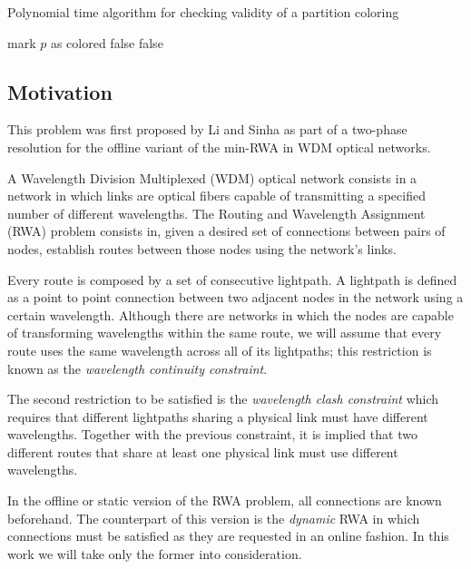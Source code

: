 \begin{algorithm}
\caption{Polynomial time algorithm for checking validity of a partition coloring}
\label{alg:pcpvalidity}
\begin{algorithmic}

			\STATE mark $p$ as colored
					\RETURN false
				\ENDIF	
			\ENDFOR
		\ENDIF
	\ENDFOR
		\RETURN false
	\ENDIF	
\ENDFOR

\end{algorithmic}
\end{algorithm}

\subsection{Motivation}

This problem was first proposed by Li and Sinha \cite{Li00thepartition} as part of a two-phase resolution for the offline variant of the min-RWA in WDM optical networks.

A Wavelength Division Multiplexed (WDM) optical network consists in a network in which links are optical fibers capable of transmitting a specified number of different wavelengths. The Routing and Wavelength Assignment (RWA) problem consists in, given a desired set of connections between pairs of nodes, establish routes between those nodes using the network's links.

Every route is composed by a set of consecutive lightpath. A lightpath is defined as a point to point connection between two adjacent nodes in the network using a certain wavelength. Although there are networks in which the nodes are capable of transforming wavelengths within the same route, we will assume that every route uses the same wavelength across all of its lightpaths; this restriction is known as the \textit{wavelength continuity constraint}.

The second restriction to be satisfied is the \textit{wavelength clash constraint} which requires that different lightpaths sharing a physical link must have different wavelengths. Together with the previous constraint, it is implied that two different routes that share at least one physical link must use different wavelengths.

In the offline or static version of the RWA problem, all connections are known beforehand. The counterpart of this version is the \textit{dynamic} RWA in which connections must be satisfied as they are requested in an online fashion. In this work we will take only the former into consideration.

